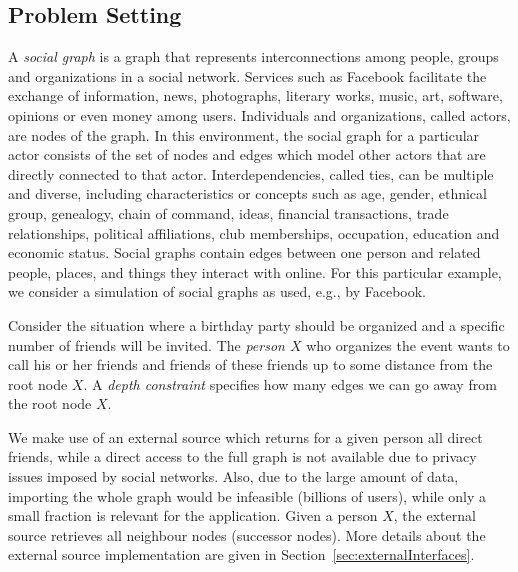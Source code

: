 \documentclass[a4paper, titlepage]{article}
\begin{document}
\subsection{Problem Setting}
A \emph{social graph} is a graph that represents 
interconnections among people, groups 
and organizations in a social network. Services such as 
Facebook facilitate the exchange 
of information, news, photographs, literary works, music, 
art, software, opinions or even 
money among users. 
Individuals and organizations, called actors, are nodes of 
the graph.
In this environment, the social graph 
for a particular actor consists 
of the set of nodes and edges which model other actors that 
are directly connected to that actor. 
Interdependencies, 
called ties, can be multiple and diverse, including 
characteristics or concepts such as age, 
gender, ethnical group, genealogy, chain of command, ideas, financial 
transactions, trade relationships, 
political affiliations, club memberships, occupation, 
education and economic status. 
Social graphs contain edges between one person and related 
people, places, and things they interact 
with online. For this particular example, we consider a 
simulation of social graphs as used, e.g., by Facebook. 

Consider the situation where a birthday party should be 
organized and a specific number of friends will be invited. 
The \emph{person $X$} who organizes the event wants to 
call his or her friends and friends of these friends up to 
some distance from the root node $X$. A \emph{depth 
constraint} specifies how many edges we can go away from 
the root node $X$.
 

We make use of an external source which returns for a given 
person all direct friends, while a direct access to the 
full graph is not available due to privacy issues imposed 
by social networks. Also, due to the large amount of data, 
importing the whole graph would be infeasible (billions of 
users), while only a small fraction is relevant for the 
application. Given a person $X$,
the external source retrieves all 
neighbour nodes (successor nodes). More details about the 
external source implementation are given in 
Section~\ref{sec:externalInterfaces}. 
               
\end{document}
